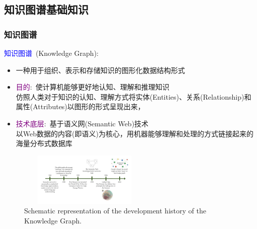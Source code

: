 \subsection{知识图谱基础知识}
\frame
{
	\frametitle{知识图谱}
	\textcolor{blue}{知识图谱}~\textrm{(Knowledge Graph)}:
	\begin{itemize}
		\item 一种用于组织、表示和存储知识的图形化数据结构形式
		\item \textcolor{purple}{目的}:~使计算机能够更好地认知、理解和推理知识\\
			仿照人类对于知识的认知、理解方式将实体\textrm{(Entities)}、关系\textrm{(Relationship)}和属性\textrm{(Attributes)}以图形的形式呈现出来，
		\item \textcolor{purple}{技术底层}:~基于语义网\textrm{(Semantic Web)}技术\\
			以\textrm{Web}数据的内容(即语义)为核心，用机器能够理解和处理的方式链接起来的海量分布式数据库
	\end{itemize}
\begin{figure}[h!]
\centering
\vskip -8pt
\includegraphics[height=1.00in,width=2.50in,viewport=0 0 160 75,clip]{Figures/Development-history-of-the-knowledge-graph.jpg}
\caption{\tiny\textrm{Schematic representation of the development history of the Knowledge Graph.}}%
\label{Fig:Knowledge-history}
\end{figure}
}

